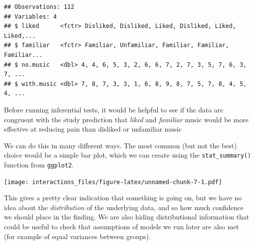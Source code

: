 \documentclass[]{article}
\newenvironment{Shaded}{\begin{snugshade}}{\end{snugshade}}
\newcommand{\KeywordTok}[1]{\textcolor[rgb]{0.13,0.29,0.53}{\textbf{#1}}}
\newcommand{\DataTypeTok}[1]{\textcolor[rgb]{0.13,0.29,0.53}{#1}}
\newcommand{\StringTok}[1]{\textcolor[rgb]{0.31,0.60,0.02}{#1}}
\newcommand{\OperatorTok}[1]{\textcolor[rgb]{0.81,0.36,0.00}{\textbf{#1}}}
\newcommand{\NormalTok}[1]{#1}
\theoremstyle{definition}
\theoremstyle{definition}
\theoremstyle{definition}
\theoremstyle{remark}
\begin{document}
\begin{Shaded}
\end{Shaded}

\begin{verbatim}
## Observations: 112
## Variables: 4
## $ liked      <fctr> Disliked, Disliked, Liked, Disliked, Liked, Liked,...
## $ familiar   <fctr> Familiar, Unfamiliar, Familiar, Familiar, Familiar...
## $ no.music   <dbl> 4, 4, 6, 5, 3, 2, 6, 6, 7, 2, 7, 3, 5, 7, 6, 3, 7, ...
## $ with.music <dbl> 7, 8, 7, 3, 3, 1, 6, 8, 9, 8, 7, 5, 7, 8, 4, 5, 4, ...
\end{verbatim}

Before running inferential tests, it would be helpful to see if the data
are congruent with the study prediction that \emph{liked} and
\emph{familiar} music would be more effective at reducing pain than
disliked or unfamiliar music

We can do this in many different ways. The most common (but not the
best) choice would be a simple bar plot, which we can create using the
\texttt{stat\_summary()} function from \texttt{ggplot2}.

\begin{Shaded}
\end{Shaded}

\texttt{[image: interactions\_files/figure-latex/unnamed-chunk-7-1.pdf]}

This gives a pretty clear indication that something is going on, but we
have no idea about the \emph{distribution} of the underlying data, and
so how much confidence we should place in the finding. We are also
hiding distributional information that could be useful to check that
assumptions of models we run later are also met (for example of equal
variances between groups).
\end{document}
